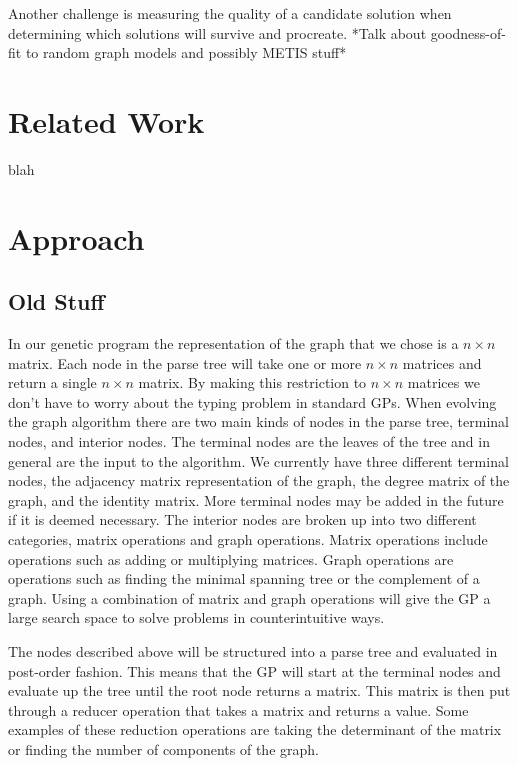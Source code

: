 \documentclass{article}
\begin{document}
Another challenge is measuring the quality of a candidate solution when determining which solutions will survive and procreate. *Talk about goodness-of-fit to random graph models and possibly METIS stuff*

\section{Related Work}
blah

\section{Approach}

\subsection{Old Stuff}

In our genetic program the representation of the graph that we chose is a $n \times n$ matrix. Each node in the parse tree will take one or more $n \times n$ matrices and return a single $n \times n$ matrix. By making this restriction to $n \times n$ matrices we don't have to worry about the typing problem in standard GPs.
When evolving the graph algorithm there are two main kinds of nodes in the parse tree, terminal nodes, and interior nodes. The terminal nodes are the leaves of the tree and in general are the input to the algorithm. We currently have three different terminal nodes, the adjacency matrix representation of the graph, the degree matrix of the graph, and the identity matrix. More terminal nodes may be added in the future if it is deemed necessary. The interior nodes are broken up into two different categories, matrix operations and graph operations. Matrix operations include operations such as adding or multiplying matrices. Graph operations are operations such as finding the minimal spanning tree or the complement of a graph. Using a combination of matrix and graph operations will give the GP a large search space to solve problems in counterintuitive ways.

The nodes described above will be structured into a parse tree and evaluated in post-order fashion. This means that the GP will start at the terminal nodes and evaluate up the tree until the root node returns a matrix. This matrix is then put through a reducer operation that takes a matrix and returns a value. Some examples of these reduction operations are taking the determinant of the matrix or finding the number of components of the graph.
\end{document}
